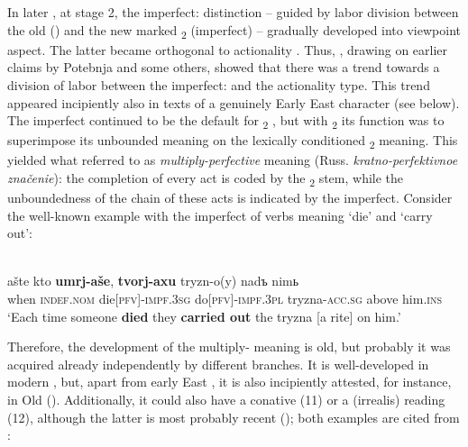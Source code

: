 \documentclass[output=paper]{langsci/langscibook}
\begin{document}
In later , at stage 2, the imperfect: distinction – guided by labor division between the old  () and the new marked \textsubscript{2}  (imperfect) – gradually developed into viewpoint aspect. The latter became orthogonal to actionality . Thus, \citet{Maslov2004[1954]}, drawing on earlier claims by Potebnja and some others, showed that there was a trend towards a division of labor between the imperfect: and the actionality type. This trend appeared incipiently also in texts of a genuinely Early East  character (see below). The imperfect continued to be the default  for \textsubscript{2} , but with \textsubscript{2}  its function was to superimpose its unbounded meaning on the lexically conditioned \textsubscript{2} meaning. This yielded what \citet[149]{Maslov2004[1954]} referred to as \textit{multiply-perfective} meaning (Russ. \textit{kratno-perfektivnoe značenie}): the completion of every act is coded by the \textsubscript{2} stem, while the unboundedness of the chain of these acts is indicated by the imperfect. Consider the well-known example with the imperfect of  verbs meaning ‘die’ and ‘carry out’:

\ea
    \label{ex:wiemerserzant:11}
    \\
 \gll ašte   kto \textbf{{umrj-aše}}, \textbf{{tvorj-axu}}       tryzn-o(y)     nadъ     nimь\\
when \textsc{indef.nom} die\textsc{[pfv]}-\textsc{impf.3sg}     do\textsc{[pfv]}-\textsc{impf.3pl} tryzna-\textsc{acc.sg} above him\textsc{.ins}\\
\glt ‘Each time someone \textbf{died} they \textbf{carried out} the tryzna [a rite] on him.’ 
\z



Therefore, the development of the multiply- meaning is old, but probably it was acquired already independently by different  branches. It is well-developed in modern  \citep[37--39]{Breu1994}, but, apart from early East , it is also incipiently attested, for instance, in Old  (\citealt[172, 175]{Maslov2004[1954]}). Additionally, it could also have a conative (11) or a  (irrealis) reading (12), although the latter is most probably recent (\citealt{Maslov2004[1954]}); both examples are cited from \citet[142]{Maslov2004[1954]}:
\end{document}
